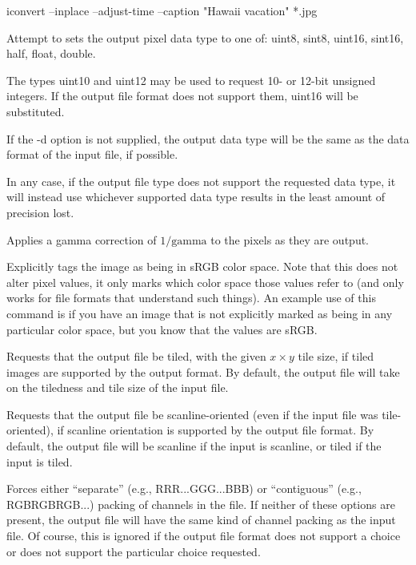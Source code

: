 \begin{code}
        iconvert --inplace --adjust-time --caption "Hawaii vacation" *.jpg
\end{code}
\apiend

Attempt to sets the output pixel data type to one of: {\cf uint8}, 
{\cf sint8}, {\cf uint16}, {\cf sint16}, {\cf half}, {\cf float}, 
{\cf double}.

The types {\cf uint10} and {\cf uint12} may be used to request 10- or
12-bit unsigned integers.  If the output file format does not support
them, {\cf uint16} will be substituted.

If the {\cf -d} option is not supplied, the output data type will
be the same as the data format of the input file, if possible.

In any case, if the output file type does not support the requested
data type, it will instead use whichever supported data type results
in the least amount of precision lost.

\apiend

Applies a gamma correction of $1/\mathrm{gamma}$ to the pixels as they
are output.
\apiend

Explicitly tags the image as being in sRGB color space.  Note that this
does not alter pixel values, it only marks which color space those
values refer to (and only works for file formats that understand such
things).  An example use of this command is if you have an image 
that is not explicitly marked as being in any particular color space,
but you know that the values are sRGB.
\apiend

Requests that the output file be tiled, with the given $x \times y$ 
tile size, if tiled images are supported by the output format.
By default, the output file will take on the tiledness and tile size
of the input file.
\apiend

Requests that the output file be scanline-oriented (even if the input
file was tile-oriented), if scanline orientation is supported by the
output file format.  By default, the output file will be scanline
if the input is scanline, or tiled if the input is tiled.
\apiend

Forces either ``separate'' (e.g., RRR...GGG...BBB) or ``contiguous''
(e.g., RGBRGBRGB...) packing of channels in the file.  If neither
of these options are present, the output file will have the same
kind of channel packing as the input file.  Of course, this is ignored
if the output file format does not support a choice or does not support
the particular choice requested.
\apiend

